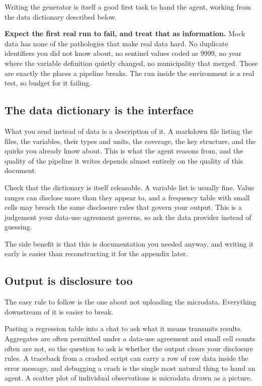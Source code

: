 \documentclass[11pt,a4paper]{article}
\begin{document}
Writing the generator is itself a good first task to hand the agent, working from
the data dictionary described below.

\begin{aside}
\textbf{Expect the first real run to fail, and treat that as information.} Mock
data has none of the pathologies that make real data hard. No duplicate
identifiers you did not know about, no sentinel values coded as 9999, no year
where the variable definition quietly changed, no municipality that merged. Those
are exactly the places a pipeline breaks. The run inside the environment is a
real test, so budget for it failing.
\end{aside}

\subsection{The data dictionary is the interface}

What you send instead of data is a description of it. A markdown file listing the
files, the variables, their types and units, the coverage, the key structure, and
the quirks you already know about. This is what the agent reasons from, and the
quality of the pipeline it writes depends almost entirely on the quality of this
document.

Check that the dictionary is itself releasable. A variable list is usually fine.
Value ranges can disclose more than they appear to, and a frequency table with
small cells may breach the same disclosure rules that govern your output. This is
a judgement your data-use agreement governs, so ask the data provider instead of
guessing.

The side benefit is that this is documentation you needed anyway, and writing it
early is easier than reconstructing it for the appendix later.

\subsection{Output is disclosure too}

The easy rule to follow is the one about not uploading the microdata. Everything
downstream of it is easier to break.

Pasting a regression table into a chat to ask what it means transmits results.
Aggregates are often permitted under a data-use agreement and small cell counts
often are not, so the question to ask is whether the output clears your
disclosure rules. A traceback from a crashed script can carry a row
of raw data inside the error message, and debugging a crash is the single most
natural thing to hand an agent. A scatter plot of individual observations is
microdata drawn as a picture.
\end{document}

